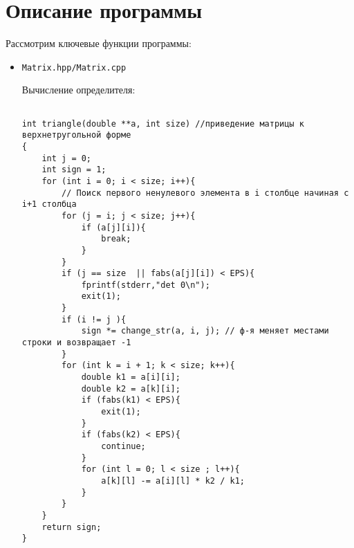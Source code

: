 \documentclass[a4paper,12pt,titlepage,finall]{article}
\begin{document}
\section{Описание программы}
Рассмотрим ключевые функции программы:\\

\begin{itemize}
\item \begin{verbatim}Matrix.hpp/Matrix.cpp\end{verbatim}

Вычисление определителя:
\begin{lstlisting}

int triangle(double **a, int size) //приведение матрицы к верхнетругольной форме
{
    int j = 0;
    int sign = 1;
    for (int i = 0; i < size; i++){
        // Поиск первого ненулевого элемента в i столбце начиная с i+1 столбца
        for (j = i; j < size; j++){
            if (a[j][i]){
                break;
            }
        }
        if (j == size  || fabs(a[j][i]) < EPS){
            fprintf(stderr,"det 0\n");
            exit(1);
        }
        if (i != j ){
            sign *= change_str(a, i, j); // ф-я меняет местами строки и возвращает -1
        }
        for (int k = i + 1; k < size; k++){
            double k1 = a[i][i];
            double k2 = a[k][i];
            if (fabs(k1) < EPS){
                exit(1);
            }
            if (fabs(k2) < EPS){
                continue;
            }
            for (int l = 0; l < size ; l++){
                a[k][l] -= a[i][l] * k2 / k1;
            }
        }
    }
    return sign;
}


\end{lstlisting}
\end{itemize}
\end{document}
